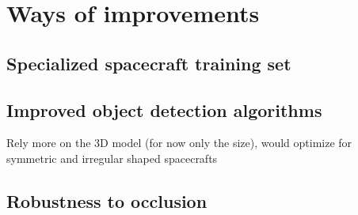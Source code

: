 
\chapter{Ways of improvements}\label{chapter:ways_of_improvements}

\section{Specialized spacecraft training set}
\section{Improved object detection algorithms}
Rely more on the 3D model (for now only the size), would optimize for symmetric and irregular shaped spacecrafts
\section{Robustness to occlusion}